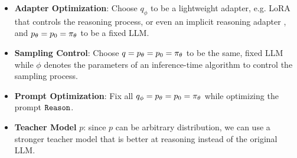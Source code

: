 \begin{itemize}[left=4pt]
    \item \textbf{Adapter Optimization}: Choose $q_\phi$ to be a lightweight adapter, e.g. LoRA \citep{DBLP:conf/iclr/HuSWALWWC22} that controls the reasoning process, or even an implicit reasoning adapter \citep{DBLP:journals/corr/abs-2311-01460}, and $p_\theta = p_0 = \operatorname{\pi_\theta}$ to be a fixed LLM.
    \item \textbf{Sampling Control}: Choose $q = p_\theta = p_0 = \operatorname{\pi_\theta}$ to be the same, fixed LLM while $\phi$ denotes the parameters of an inference-time algorithm to control the sampling process.
    \item \textbf{Prompt Optimization}: Fix all $q_\phi = p_\theta = p_0 = \operatorname{\pi_\theta}$ while optimizing the prompt $\operatorname{\mathtt{Reason}}$.
    \item \textbf{Teacher Model} $p$: since $p$ can be arbitrary distribution, we can use a stronger teacher model that is better at reasoning instead of the original LLM.
\end{itemize}

\fi 

